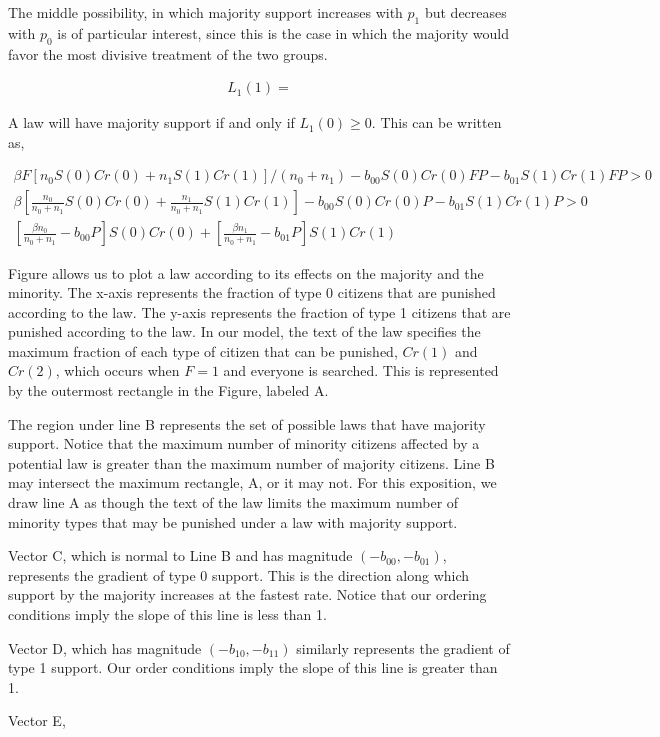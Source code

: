 The middle possibility, in which majority support increases with $p_1$ but decreases with $p_0$ is of particular interest, since this is the case in which the majority would favor the most divisive treatment of the two groups.

\begin{align}
L_1(1) = 
\end{align}



A law will have majority support if and only if $L_1(0) \geq 0$.  This can be written as,

\begin{align}
\beta F\left[ n_0 S(0)Cr(0) + n_1 S(1)Cr(1)\right]/(n_0 + n_1)  - b_{00}S(0)Cr(0)FP - b_{01}  S(1)Cr(1)FP > 0 \\
\beta \left[ \frac{n_0}{n_0 + n_1}  S(0)Cr(0) + \frac{n_1}{n_0 + n_1} S(1)Cr(1)\right] - b_{00}S(0)Cr(0)P - b_{01}  S(1)Cr(1)P > 0 \\
[  \frac{\beta n_0}{n_0 + n_1} - b_{00}P  ]S(0)Cr(0) + [ \frac{\beta n_1}{n_0 + n_1} -  b_{01}P ] S(1)Cr(1) 
\end{align}

Figure  allows us to plot a law according to its effects on the majority and the minority.  The x-axis represents the fraction of type 0 citizens that are punished according to the law.  The y-axis represents the fraction of type 1 citizens that are punished according to the law.  In our model, the text of the law specifies the maximum fraction of each type of citizen that can be punished, $Cr(1)$ and $Cr(2)$, which occurs when $F=1$ and everyone is searched.  This is represented by the outermost rectangle in the Figure, labeled A.

The region under line B represents the set of possible laws that have majority support.  Notice that the maximum number of minority citizens affected by a potential law is greater than the maximum number of majority citizens.  Line B may intersect the maximum rectangle, A, or it may not.  For this exposition, we draw line A as though the text of the law limits the maximum number of minority types that may be punished under a law with majority support.

Vector C, which is normal to Line B and has magnitude $(-b_{00}, -b_{01})$, represents the gradient of type 0 support.  This is the direction along which support by the majority increases at the fastest rate.  Notice that our ordering conditions imply the slope of this line is less than 1.

Vector D, which has magnitude $(-b_{10}, -b_{11})$ similarly represents the gradient of type 1 support.  Our order conditions imply the slope of this line is greater than 1.

Vector E, 



